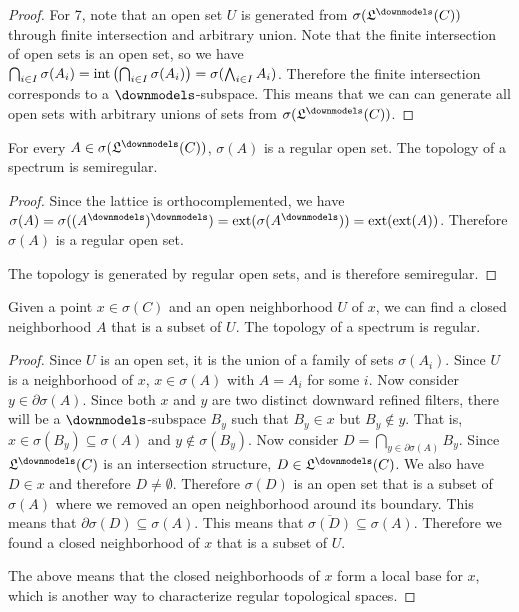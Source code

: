 \begin{proof}
		For 7, note that an open set $U$ is generated from $\sigma(\mathfrak{L}^\separate(C))$ through finite intersection and arbitrary union. Note that the finite intersection of open sets is an open set, so we have $\bigcap_{i \in I} \sigma(A_i) = \operatorname{int}\left(\bigcap_{i \in I} \sigma(A_i)\right) = \sigma(\bigwedge_{i \in I} A_i)$. Therefore the finite intersection corresponds to a $\separate$-subspace. This means that we can can generate all open sets with arbitrary unions of sets from $\sigma(\mathfrak{L}^\separate(C))$.
	\end{proof}

\begin{coro}
	For every $A \in\sigma(\mathfrak{L}^\separate(C))$, $\sigma(A)$ is a regular open set. The topology of a spectrum is semiregular.
\end{coro}

\begin{proof}
	Since the lattice is orthocomplemented, we have $\sigma(A) = \sigma((A^{\separate})^{\separate}) = \exterior(\sigma(A^{\separate})) = \exterior(\exterior(A))$. Therefore $\sigma(A)$ is a regular open set.
	
	The topology is generated by regular open sets, and is therefore semiregular.
\end{proof}

\begin{conj}
	Given a point $x \in \sigma(C)$ and an open neighborhood $U$ of $x$, we can find a closed neighborhood $A$ that is a subset of $U$. The topology of a spectrum is regular.
\end{conj}

\begin{proof}
	Since $U$ is an open set, it is the union of a family of sets $\sigma(A_i)$. Since $U$ is a neighborhood of $x$, $x \in \sigma(A)$ with $A = A_i$ for some $i$. Now consider $y \in \partial \sigma(A)$. Since both $x$ and $y$ are two distinct downward refined filters, there will be a $\separate$-subspace $B_y$ such that $B_y \in x$ but $B_y \notin y$. That is, $x \in \sigma(B_y) \subseteq \sigma(A)$ and $y \notin \sigma(B_y)$. Now consider $D = \bigcap_{y \in \partial \sigma(A)} B_y$. Since $\mathfrak{L}^\separate(C)$ is an intersection structure, $D \in \mathfrak{L}^\separate(C)$. We also have $D \in x$ and therefore $D \neq \emptyset$. Therefore $\sigma(D)$ is an open set that is a subset of $\sigma(A)$ where we removed an open neighborhood around its boundary. This means that $\partial \sigma(D) \subseteq \sigma(A)$. This means that $\overline{\sigma(D)} \subseteq \sigma(A)$. Therefore we found a closed neighborhood of $x$ that is a subset of $U$.
	
	The above means that the closed neighborhoods of $x$ form a local base for $x$, which is another way to characterize regular topological spaces.
\end{proof}

